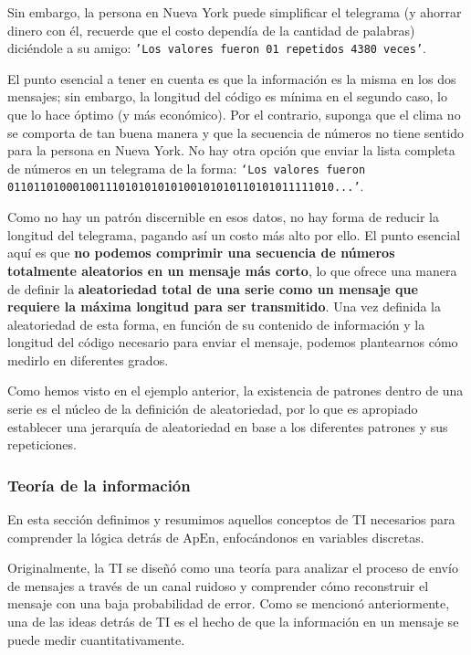 \documentclass[a4paper,12pt]{article}
\begin{document}
\clearpage

Sin embargo, la persona en Nueva York puede simplificar el telegrama (y ahorrar dinero con él, recuerde que el costo dependía de la cantidad de palabras) diciéndole a su amigo:
\texttt{'Los valores fueron 01 repetidos 4380 veces'}. 

El punto esencial a tener en cuenta es que la información es la misma en los dos mensajes; sin embargo, la longitud del código es mínima en el segundo caso, lo que lo hace óptimo (y más económico). Por el contrario, suponga que el clima no se comporta de tan buena manera y que la secuencia de números no tiene sentido para la persona en Nueva York. No hay otra opción que enviar la lista completa de números en un telegrama de la forma: \texttt{`Los valores fueron 01101101000100111010101010100101010110101011111010...'}. 

Como no hay un patrón discernible en esos datos, no hay forma de reducir la longitud del telegrama, pagando así un costo más alto por ello. El punto esencial aquí es que \textbf{no podemos comprimir una secuencia de números totalmente aleatorios en un mensaje más corto}, lo que ofrece una manera de definir la \textbf{aleatoriedad total de una serie como un mensaje que requiere la máxima longitud para ser transmitido}. Una vez definida la aleatoriedad de esta forma, en función de su contenido de información y la longitud del código necesario para enviar el mensaje, podemos plantearnos cómo medirlo en diferentes grados. 

Como hemos visto en el ejemplo anterior, la existencia de patrones dentro de una serie es el núcleo de la definición de aleatoriedad, por lo que es apropiado establecer una jerarquía de aleatoriedad en base a los diferentes patrones y sus repeticiones.

\subsubsection{Teoría de la información}

En esta sección definimos y resumimos aquellos conceptos de TI necesarios para comprender la lógica detrás de $\textrm{ApEn}$, enfocándonos en variables discretas.

Originalmente, la TI se diseñó como una teoría para analizar el proceso de envío de mensajes a través de un canal ruidoso y comprender cómo reconstruir el mensaje con una baja probabilidad de error. Como se mencionó anteriormente, una de las ideas detrás de TI es el hecho de que la información en un mensaje se puede medir cuantitativamente. 
\end{document}
